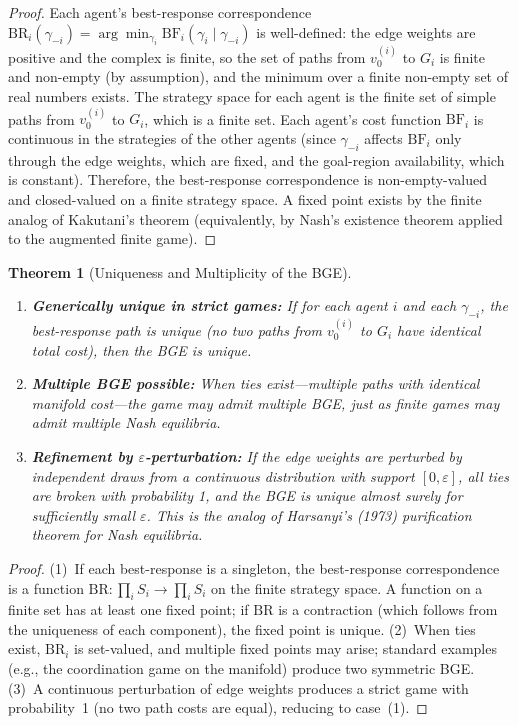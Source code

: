 \documentclass[12pt]{article}
\newtheorem{theorem}{Theorem}[section]
\theoremstyle{definition}
\theoremstyle{remark}
\newcommand{\BF}{\mathrm{BF}}              %
\begin{document}
\begin{proof}
Each agent's best-response correspondence $\mathrm{BR}_i(\gamma_{-i}) = \arg\min_{\gamma_i} \BF_i(\gamma_i \mid \gamma_{-i})$ is well-defined: the edge weights are positive and the complex is finite, so the set of paths from $v_0^{(i)}$ to $G_i$ is finite and non-empty (by assumption), and the minimum over a finite non-empty set of real numbers exists.  The strategy space for each agent is the finite set of simple paths from $v_0^{(i)}$ to $G_i$, which is a finite set.  Each agent's cost function $\BF_i$ is continuous in the strategies of the other agents (since $\gamma_{-i}$ affects $\BF_i$ only through the edge weights, which are fixed, and the goal-region availability, which is constant).  Therefore, the best-response correspondence is non-empty-valued and closed-valued on a finite strategy space.  A fixed point exists by the finite analog of Kakutani's theorem (equivalently, by Nash's existence theorem applied to the augmented finite game).
\end{proof}

\begin{theorem}[Uniqueness and Multiplicity of the BGE]
\label{thm:bge_uniqueness}
\hfill
\begin{enumerate}
    \item \textbf{Generically unique in strict games:} If for each agent $i$ and each $\gamma_{-i}$, the best-response path is unique (no two paths from $v_0^{(i)}$ to $G_i$ have identical total cost), then the BGE is unique.
    \item \textbf{Multiple BGE possible:} When ties exist---multiple paths with identical manifold cost---the game may admit multiple BGE, just as finite games may admit multiple Nash equilibria.
    \item \textbf{Refinement by $\varepsilon$-perturbation:} If the edge weights are perturbed by independent draws from a continuous distribution with support $[0, \varepsilon]$, all ties are broken with probability 1, and the BGE is unique almost surely for sufficiently small $\varepsilon$.  This is the analog of Harsanyi's (1973) purification theorem for Nash equilibria.
\end{enumerate}
\end{theorem}

\begin{proof}
(1)~If each best-response is a singleton, the best-response correspondence is a function $\mathrm{BR}: \prod_i S_i \to \prod_i S_i$ on the finite strategy space.  A function on a finite set has at least one fixed point; if $\mathrm{BR}$ is a contraction (which follows from the uniqueness of each component), the fixed point is unique.  (2)~When ties exist, $\mathrm{BR}_i$ is set-valued, and multiple fixed points may arise; standard examples (e.g., the coordination game on the manifold) produce two symmetric BGE.  (3)~A continuous perturbation of edge weights produces a strict game with probability~1 (no two path costs are equal), reducing to case~(1).
\end{proof}
\end{document}
